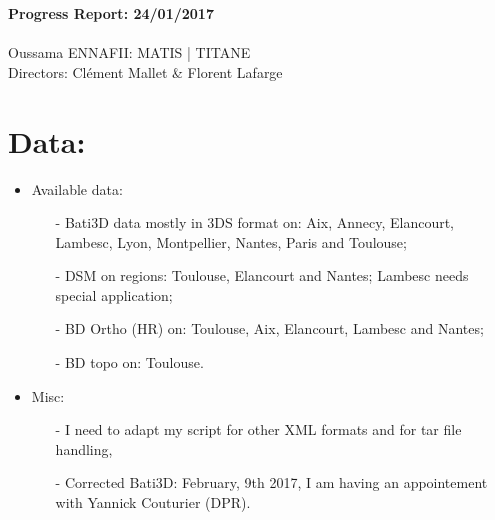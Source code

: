 \documentclass[a4paper, 11pt]{article}
\begin{document}
	\begin{centering}
		\large\textbf{Progress Report: 24/01/2017}\\
		~\\
		Oussama ENNAFII:
		\normalsize MATIS | TITANE \\
		Directors: Cl\'ement Mallet \& Florent Lafarge \\
	\end{centering}


	\section*{Data:}
	
	\begin{itemize}
		\item Available data:
			\begin{itemize}
				\item[-] Bati3D data mostly in 3DS format on: Aix, Annecy, Elancourt, Lambesc, Lyon, Montpellier, Nantes, Paris and Toulouse;
				\item[-] DSM on regions: Toulouse, Elancourt and Nantes; Lambesc needs special application;
				\item[-] BD Ortho (HR) on: Toulouse, Aix, Elancourt, Lambesc and Nantes;
				\item[-] BD topo on: Toulouse.
			\end{itemize}
		\item Misc:
			\begin{itemize}
				\item[-] I need to adapt my script for other XML formats and for tar file handling,
				\item[-] Corrected Bati3D: February, 9th 2017, I am having an appointement with Yannick Couturier (DPR).
			\end{itemize}
	\end{itemize}
	
\end{document}
